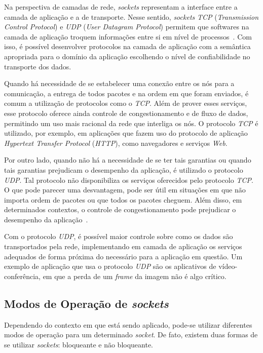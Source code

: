 \documentclass[12pt]{article}
\begin{document}
Na perspectiva de camadas de rede, \textit{sockets} representam a interface
entre a camada de aplicação e a de transporte. Nesse sentido, \textit{sockets}
\emph{TCP} (\emph{Transmission Control Protocol}) e \emph{UDP} (\emph{User
Datagram Protocol}) permitem que softwares na camada de aplicação troquem
informações entre si em nível de processos~\cite{Tanenbaum}. Com isso, é
possível desenvolver protocolos na camada de aplicação com a semântica
apropriada para o domínio da aplicação escolhendo o nível de confiabilidade no
transporte dos dados.

Quando há necessidade de se estabelecer uma conexão entre os nós para a
comunicação, a entrega de todos pacotes e na ordem em que foram enviados, é
comum a utilização de protocolos como o \emph{TCP}. Além de prover esses serviços,
esse protocolo oferece ainda controle de congestionamento e de fluxo de dados,
permitindo um uso mais racional da rede que interliga os nós. O protocolo \emph{TCP} é
utilizado, por exemplo, em aplicações que fazem uso do protocolo de aplicação
\emph{Hypertext Transfer Protocol} (\emph{HTTP}), como navegadores e serviços \emph{Web}.

Por outro lado, quando não há a necessidade de se ter tais garantias ou quando
tais garantias prejudicam o desempenho da aplicação, é utilizado o protocolo
\emph{UDP}. Tal protocolo não disponibiliza os serviços oferecidos pelo protocolo \emph{TCP}.
O que pode parecer uma desvantagem, pode ser útil em situações em que não
importa ordem de pacotes ou que todos os pacotes cheguem. Além disso, em
determinados contextos, o controle de congestionamento pode prejudicar o
desempenho da aplicação~\cite{Kurose}.

Com o protocolo \emph{UDP}, é possível maior controle sobre como os dados são
transportados pela rede, implementando em camada de aplicação os serviços
adequados de forma próxima do necessário para a aplicação em questão. Um
exemplo de aplicação que usa o protocolo \emph{UDP} são os aplicativos de
vídeo-conferência, em que a perda de um \textit{frame} da imagem não é algo
crítico.

\subsection{Modos de Operação de \textit{sockets}} \label{sub:modos}

Dependendo do contexto em que está sendo aplicado, pode-se utilizar diferentes
modos de operação para um determinado \textit{socket}. De fato, existem duas
formas de se utilizar \emph{sockets}: bloqueante e não bloqueante.
\end{document}
